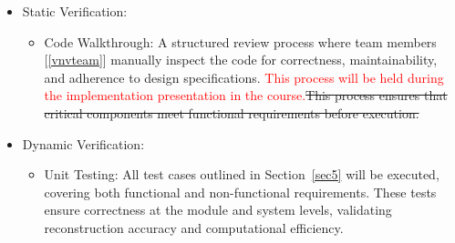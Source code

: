 \documentclass[12pt, titlepage]{article}
\newcommand{\add}{\textcolor{red}}
\begin{document}
\begin{itemize}
\item Static Verification:
  \begin{itemize}
      \item Code Walkthrough: A structured review process where team members [\ref{vnvteam}]
        manually inspect the code for correctness, maintainability, and
        adherence to design specifications. \add{This process will be held
          during the implementation presentation in the course.}\st{This process ensures that critical
        components meet functional requirements before execution.}
  \end{itemize}
  \item Dynamic Verification:
    \begin{itemize}
      \item Unit Testing: All test cases outlined in Section~\ref{sec5} will
        be executed, covering both functional and non-functional requirements.
        These tests ensure correctness at the module and system levels,
        validating reconstruction accuracy and computational efficiency.
      \end{itemize}
  \end{itemize}
\end{document}

